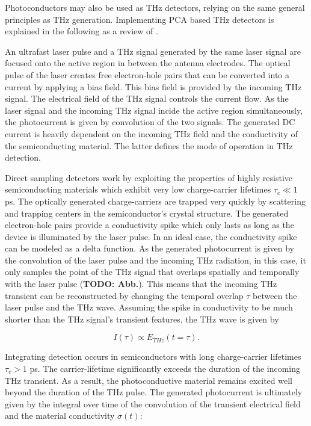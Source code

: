 Photoconductors may also be used as THz detectors, relying on the same general principles as THz generation. Implementing PCA based THz detectors is explained in the following as a review of \cite{preuPrinciplesTHzGeneration2015,castro-camusPhotoconductiveResponseCorrection2008}. 

An ultrafast laser pulse and a THz signal generated by the same laser signal are focused onto the active region in between the antenna electrodes. The optical pulse of the laser creates free electron-hole pairs that can be converted into a current by applying a bias field. This bias field is provided by the incoming THz signal. The electrical field of the THz signal controls the current flow. As the laser signal and the incoming THz signal incide the active region simultaneously, the photocurrent is given by convolution of the two signals. The generated DC current is heavily dependent on the incoming THz field and the conductivity of the semiconducting material. The latter defines the mode of operation in THz detection. 

Direct sampling detectors work by exploiting the properties of highly resistive semiconducting materials which exhibit very low charge-carrier lifetimes $\tau_c \ll 1$ \si{\pico \s}. The optically generated charge-carriers are trapped very quickly by scattering and trapping centers in the semiconductor's crystal structure. The generated electron-hole pairs provide a conductivity spike which only lasts as long as the device is illuminated by the laser pulse. In an ideal case, the conductivity spike can be modeled as a delta function. As the generated photocurrent is given by the convolution of the laser pulse and the incoming THz radiation, in this case, it only samples the point of the THz signal that overlaps spatially and temporally with the laser pulse (\textbf{TODO: Abb.}). This means that the incoming THz transient can be reconstructed by changing the temporal overlap $\tau$ between the laser pulse and the THz wave. Assuming the spike in conductivity to be much shorter than the THz signal's transient features, the THz wave is given by

\begin{equation}
	I(\tau) \propto E_{THz}(t=\tau).
\end{equation}

Integrating detection occurs in semiconductors with long charge-carrier lifetimes $\tau_c > 1$ \si{\pico \s}. The carrier-lifetime significantly exceeds the duration of the incoming THz transient. As a result, the photoconductive material remains excited well beyond the duration of the THz pulse. The generated photocurrent is ultimately given by the integral over time of the convolution of the transient electrical field and the material conductivity $\sigma(t)$:

